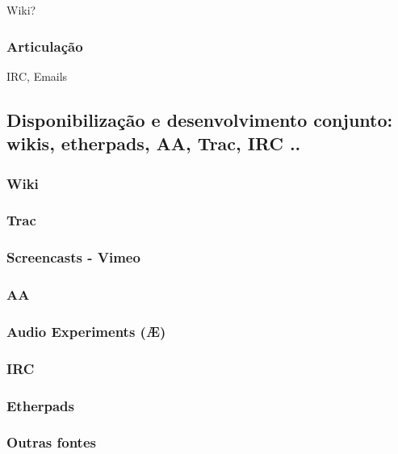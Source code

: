       Wiki?

      \subsubsection{Articulação}

      IRC, Emails

\subsection{Disponibilização e desenvolvimento conjunto: wikis, etherpads, AA, Trac, IRC ..}

\subsubsection{Wiki}

\subsubsection{Trac}

\subsubsection{Screencasts - Vimeo}

\subsubsection{AA}

\subsubsection{Audio Experiments (Æ)}

\subsubsection{IRC}

\subsubsection{Etherpads}

\subsubsection{Outras fontes}


